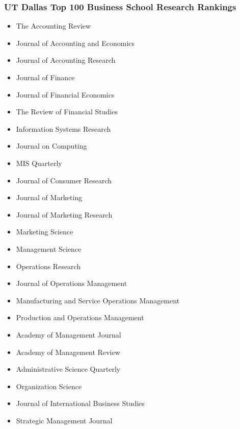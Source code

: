 \subsubsection*{UT Dallas Top 100 Business School Research Rankings}\label{appendix:subsec:UTDallas}
\begin{itemize}
    \item The Accounting Review
    \item Journal of Accounting and Economics
    \item Journal of Accounting Research
    \item Journal of Finance
    \item Journal of Financial Economics
    \item The Review of Financial Studies
    \item Information Systems Research
    \item Journal on Computing
    \item MIS Quarterly
    \item Journal of Consumer Research
    \item Journal of Marketing
    \item Journal of Marketing Research
    \item Marketing Science
    \item Management Science
    \item Operations Research
    \item Journal of Operations Management
    \item Manufacturing and Service Operations Management
    \item Production and Operations Management
    \item Academy of Management Journal
    \item Academy of Management Review
    \item Administrative Science Quarterly
    \item Organization Science
    \item Journal of International Business Studies
    \item Strategic Management Journal
\end{itemize}
